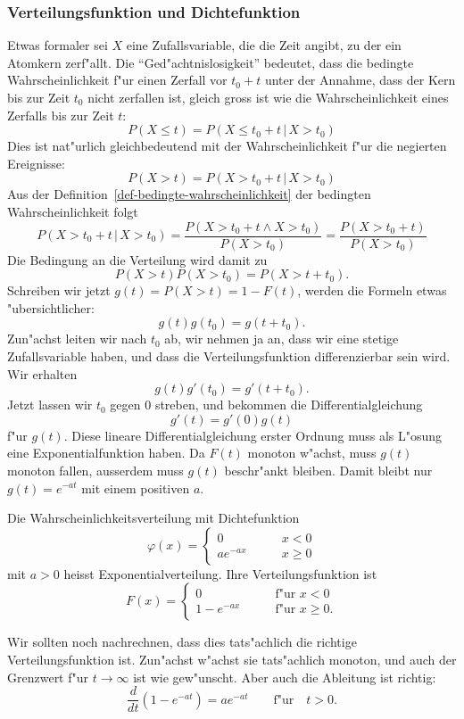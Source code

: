 \subsubsection{Verteilungsfunktion und Dichtefunktion}
Etwas formaler sei $X$ eine Zufallsvariable, die die Zeit angibt, zu der
ein Atomkern zerf"allt.
Die ``Ged"achtnislosigkeit'' bedeutet, dass die
bedingte Wahrscheinlichkeit f"ur einen Zerfall vor $t_0+t$ unter der
Annahme, dass der Kern bis zur Zeit $t_0$ nicht zerfallen ist, gleich
gross ist wie die Wahrscheinlichkeit eines Zerfalls bis zur Zeit $t$:
\[
P(X \le t) = P(X\le t_0+t\,|\,X > t_0)
\]
Dies ist nat"urlich gleichbedeutend mit der Wahrscheinlichkeit f"ur
die negierten Ereignisse:
\[
P(X > t) = P(X > t_0+t\,|\,X > t_0)
\]
Aus der Definition~\ref{def-bedingte-wahrscheinlichkeit}
der bedingten Wahrscheinlichkeit folgt
\[
P(X> t_0+t\,|\,X>t_0)=\frac{P(X>t_0+t\wedge X>t_0)}{P(X > t_0)}
=\frac{P(X>t_0+t)}{P(X>t_0)}
\]
Die Bedingung an die Verteilung wird damit zu
\[
P(X>t)P(X>t_0)=P(X>t+t_0).
\]
Schreiben wir jetzt $g(t)=P(X>t)=1-F(t)$, werden die Formeln
etwas "ubersichtlicher:
\[
g(t)g(t_0)=g(t+t_0).
\]
Zun"achst leiten wir nach $t_0$ ab, wir nehmen ja an, dass wir
eine stetige Zufallsvariable haben, und dass die Verteilungsfunktion
differenzierbar sein wird.
Wir erhalten
\[
g(t)g'(t_0)=g'(t+t_0).
\]
Jetzt lassen wir $t_0$ gegen $0$ streben, und bekommen
die Differentialgleichung
\[
g'(t)=g'(0)g(t)
\]
f"ur $g(t)$.
Diese lineare Differentialgleichung erster Ordnung
muss als L"osung eine Exponentialfunktion haben.
Da $F(t)$
monoton w"achst, muss $g(t)$ monoton fallen, ausserdem
muss $g(t)$ beschr"ankt bleiben.
Damit bleibt nur
$g(t)=e^{-at}$ mit einem positiven $a$.

\begin{definition}
Die Wahrscheinlichkeitsverteilung mit Dichtefunktion
\[
\varphi(x)=\begin{cases}
0&\qquad x<0\\
a e^{-a x}&\qquad x\ge 0
\end{cases}
\]
mit $a>0$ heisst Exponentialverteilung.
Ihre Verteilungsfunktion ist
\[
F(x)=\begin{cases}
0&\qquad\text{f"ur $x < 0$}\\
1-e^{-ax}&\qquad\text{f"ur $x\ge 0$}.
\end{cases}
\]
\end{definition}
Wir sollten noch nachrechnen, dass dies tats"achlich die richtige
Verteilungsfunktion ist.
Zun"achst w"achst sie tats"achlich monoton,
und auch der Grenzwert f"ur $t\to\infty$ ist wie gew"unscht.
Aber
auch die Ableitung ist richtig:
\[
\frac{d}{dt}(1-e^{-at})=ae^{-at}\qquad\text{f"ur}\quad t>0.
\]

